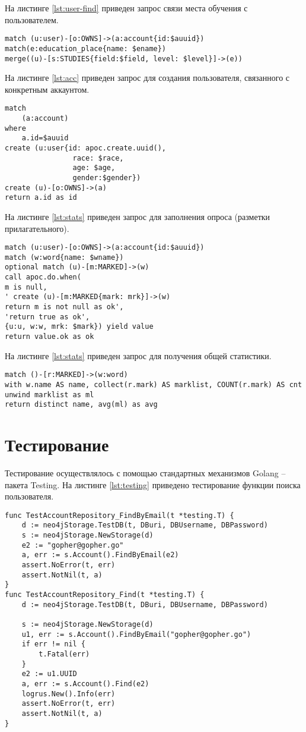 На листинге \ref{lst:user-find} приведен запрос связи места обучения с пользователем.
\begin{lstlisting}[label=lst:user-find,caption=Запрос связи места обучения с пользователем]
match (u:user)-[o:OWNS]->(a:account{id:$auuid})
match(e:education_place{name: $ename})
merge((u)-[s:STUDIES{field:$field, level: $level}]->(e))
\end{lstlisting}
На листинге \ref{lst:acc} приведен запрос для создания пользователя, связанного с конкретным аккаунтом. 
\begin{lstlisting}[label=lst:acc,caption=Запрос для создания пользователя\, связанного с конкретным аккаунтом]
match
	(a:account)
where
	a.id=$auuid
create (u:user{id: apoc.create.uuid(),
				race: $race,
				age: $age,
				gender:$gender})
create (u)-[o:OWNS]->(a)
return a.id as id	
\end{lstlisting}
На листинге \ref{lst:stats} приведен запрос для заполнения опроса (разметки прилагательного).
\begin{lstlisting}[label=lst:poll,caption=Запрос для заполнения опроса]
match (u:user)-[o:OWNS]->(a:account{id:$auuid})
match (w:word{name: $wname})
optional match (u)-[m:MARKED]->(w)
call apoc.do.when(
m is null,
' create (u)-[m:MARKED{mark: mrk}]->(w)
return m is not null as ok',
'return true as ok',
{u:u, w:w, mrk: $mark}) yield value
return value.ok as ok
\end{lstlisting}
На листинге \ref{lst:stats} приведен запрос для получения общей статистики.
\begin{lstlisting}[label=lst:stats,caption=Запрос для получения общей статистики]
match ()-[r:MARKED]->(w:word)
with w.name AS name, collect(r.mark) AS marklist, COUNT(r.mark) AS cnt
unwind marklist as ml
return distinct name, avg(ml) as avg
\end{lstlisting}


\section{Тестирование}
Тестирование осуществлялось с помощью стандартных механизмов Golang -- пакета Testing\cite{testing}. На листинге \ref{lst:testing} приведено тестирование функции поиска пользователя.
\begin{lstlisting}[label=lst:testing,caption=Тестирование функции поиска пользователя]
func TestAccountRepository_FindByEmail(t *testing.T) {
	d := neo4jStorage.TestDB(t, DBuri, DBUsername, DBPassword)
	s := neo4jStorage.NewStorage(d)
	e2 := "gopher@gopher.go"
	a, err := s.Account().FindByEmail(e2)
	assert.NoError(t, err)
	assert.NotNil(t, a)
}
func TestAccountRepository_Find(t *testing.T) {
	d := neo4jStorage.TestDB(t, DBuri, DBUsername, DBPassword)
	
	s := neo4jStorage.NewStorage(d)
	u1, err := s.Account().FindByEmail("gopher@gopher.go")
	if err != nil {
		t.Fatal(err)
	}
	e2 := u1.UUID
	a, err := s.Account().Find(e2)
	logrus.New().Info(err)
	assert.NoError(t, err)
	assert.NotNil(t, a)
}
\end{lstlisting}
 